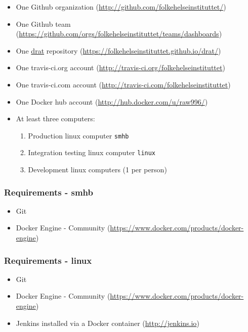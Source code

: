 \documentclass[12pt,]{article}
\providecommand{\tightlist}{%
  \setlength{\itemsep}{0pt}\setlength{\parskip}{0pt}}
\begin{document}
\begin{itemize}
\tightlist
\item
  One Github organization
  (\url{http://github.com/folkehelseinstituttet/})
\item
  One Github team
  (\url{https://github.com/orgs/folkehelseinstituttet/teams/dashboards})
\item
  One \href{https://github.com/eddelbuettel/drat}{drat} repository
  (\url{https://folkehelseinstituttet.github.io/drat/})
\item
  One travis-ci.org account
  (\url{http://travis-ci.org/folkehelseinstituttet})
\item
  One travis-ci.com account
  (\url{http://travis-ci.com/folkehelseinstituttet})
\item
  One Docker hub account (\url{http://hub.docker.com/u/raw996/})
\item
  At least three computers:

  \begin{enumerate}
  \def\labelenumi{\arabic{enumi}.}
  \tightlist
  \item
    Production linux computer \texttt{smhb}
  \item
    Integration testing linux computer \texttt{linux}
  \item
    Development linux computers (1 per person)
  \end{enumerate}
\end{itemize}

\subsubsection{Requirements - smhb}\label{requirements---smhb}

\begin{itemize}
\tightlist
\item
  Git
\item
  Docker Engine - Community
  (\url{https://www.docker.com/products/docker-engine})
\end{itemize}

\subsubsection{Requirements - linux}\label{requirements---linux}

\begin{itemize}
\tightlist
\item
  Git
\item
  Docker Engine - Community
  (\url{https://www.docker.com/products/docker-engine})
\item
  Jenkins installed via a Docker container (\url{http://jenkins.io})
\end{itemize}
\end{document}
